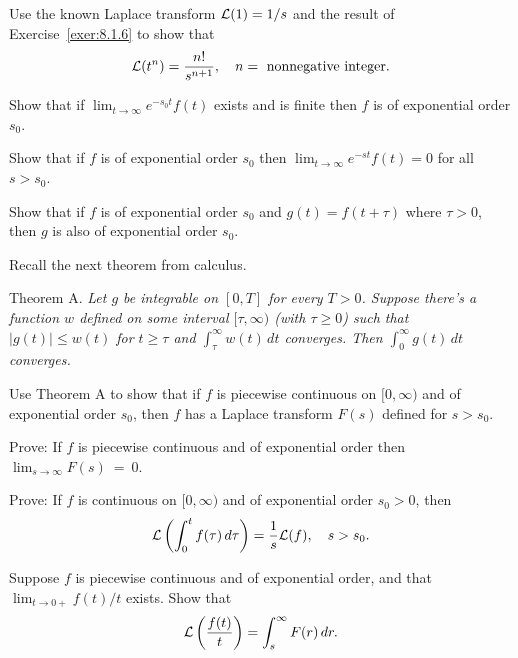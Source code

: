 \begin{exerciselist}
  \item\label{exer:8.1.8} Use the known Laplace transform ${\cal L}(1)=1/s$ and the result of
        Exercise~\ref{exer:8.1.6} to show that
  \[
    {\cal L}(t^{n})=\frac{n!}{s^{n+1}},\quad n=\mbox{ nonnegative integer}.
  \]

  \item\label{exer:8.1.9}
  \begin{alist}
    \item %
    Show that if $\lim_{t\to\infty}e^{-s_{0}t}f(t)$ exists and is finite then $f$ is of exponential
    order $s_{0}$.

    \item %
    Show that if $f$ is of exponential order $s_{0}$ then $\lim_{t \to\infty}e^{-st}f(t)=0$ for all
    $s>s_{0}$.

    \item %
    Show that if $f$ is of exponential order $s_{0}$ and $g(t)=f(t+\tau)$ where $\tau>0$, then $g$
    is also of exponential order $s_{0}$.
  \end{alist}

  \item\label{exer:8.1.10} Recall the next theorem from calculus.

  \color{blue}
  {\sc Theorem A.} \it Let $g$ be integrable on $[0,T]$ for every $T>0$. Suppose there's a function
  $w$ defined on some interval $[\tau,\infty)$ (with $\tau\ge0$) such that $|g(t)|\le w(t)$ for
  $t\ge\tau$ and $\int^{\infty}_{\tau}w(t)\,dt$ converges. Then $\int_{0}^{\infty}g(t)\,dt$
  converges.\rm
  \color{black}

  Use Theorem A to show that if $f$ is piecewise continuous on $[0,\infty)$ and of exponential order
  $s_{0}$, then $f$ has a Laplace transform $F(s)$ defined for $s>s_{0}$.

  \item\label{exer:8.1.11} Prove: If $f$ is piecewise continuous and of exponential order then
        $\lim_{s\to\infty}F(s)~=~0$.

  \item\label{exer:8.1.12} Prove: If $f$ is continuous on $[0,\infty)$ and of exponential order
        $s_{0}>0$, then
  \[
    {\cal L}\left(\int^{t}_{0}f(\tau)\,d\tau\right)=\frac{1}{s}{\cal L}(f), \quad s>s_{0}.
  \]

  \item\label{exer:8.1.13} Suppose $f$ is piecewise continuous and of exponential order, and that
        $\lim_{t\to0+}f(t)/t$ exists. Show that
  \[
    {\cal L}\left(\frac{f(t)}{t}\right)=\int^{\infty}_{s}F(r)\,dr.
  \]


\end{exerciselist}
